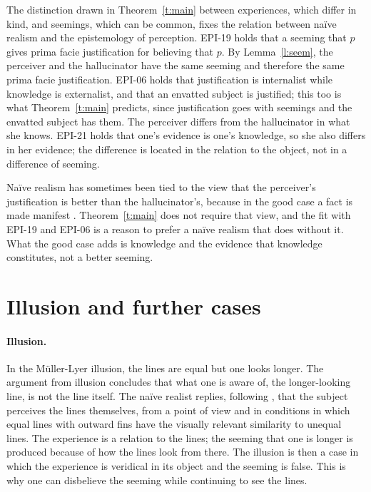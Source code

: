 \documentclass{situationist-preprint}
\begin{document}
The distinction drawn in Theorem~\ref{t:main} between experiences, which differ in kind, and seemings, which can be common, fixes the relation between naïve realism and the epistemology of perception. EPI-19 holds that a seeming that $p$ gives prima facie justification for believing that $p$. By Lemma~\ref{l:seem}, the perceiver and the hallucinator have the same seeming and therefore the same prima facie justification. EPI-06 holds that justification is internalist while knowledge is externalist, and that an envatted subject is justified; this too is what Theorem~\ref{t:main} predicts, since justification goes with seemings and the envatted subject has them. The perceiver differs from the hallucinator in what she knows. EPI-21 holds that one's evidence is one's knowledge, so she also differs in her evidence; the difference is located in the relation to the object, not in a difference of seeming.

Naïve realism has sometimes been tied to the view that the perceiver's justification is better than the hallucinator's, because in the good case a fact is made manifest \citep{McDowell1982}. Theorem~\ref{t:main} does not require that view, and the fit with EPI-19 and EPI-06 is a reason to prefer a naïve realism that does without it. What the good case adds is knowledge and the evidence that knowledge constitutes, not a better seeming.

\section{Illusion and further cases}\label{s:illusion}

\paragraph{Illusion.} In the Müller-Lyer illusion, the lines are equal but one looks longer. The argument from illusion concludes that what one is aware of, the longer-looking line, is not the line itself. The naïve realist replies, following \citet{Brewer2011}, that the subject perceives the lines themselves, from a point of view and in conditions in which equal lines with outward fins have the visually relevant similarity to unequal lines. The experience is a relation to the lines; the seeming that one is longer is produced because of how the lines look from there. The illusion is then a case in which the experience is veridical in its object and the seeming is false. This is why one can disbelieve the seeming while continuing to see the lines.
\end{document}
